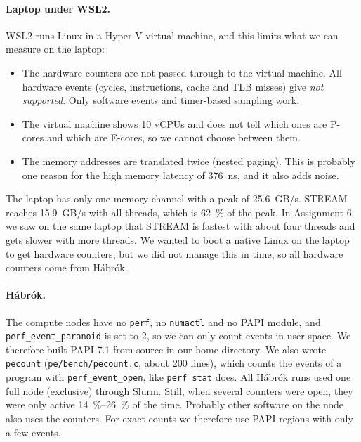 \paragraph{Laptop under WSL2.} WSL2 runs Linux in a Hyper-V virtual machine, and this limits
what we can measure on the laptop:
\begin{itemize}
  \item The hardware counters are not passed through to the virtual machine. All hardware
        events (cycles, instructions, cache and TLB misses) give \emph{not supported}. Only
        software events and timer-based sampling work.
  \item The virtual machine shows 10 vCPUs and does not tell which ones are P-cores and
        which are E-cores, so we cannot choose between them.
  \item The memory addresses are translated twice (nested paging). This is probably one
        reason for the high memory latency of \SI{376}{ns}, and it also adds noise.
\end{itemize}
The laptop has only one memory channel with a peak of \SI{25.6}{GB/s}. STREAM reaches
\SI{15.9}{GB/s} with all threads, which is \SI{62}{\percent} of the peak. In Assignment 6 we
saw on the same laptop that STREAM is fastest with about four threads and gets slower with
more threads. We wanted to boot a native Linux on the laptop to get hardware counters, but we
did not manage this in time, so all hardware counters come from Hábrók.

\paragraph{Hábrók.} The compute nodes have no \texttt{perf}, no \texttt{numactl} and no PAPI
module, and \texttt{perf\_event\_paranoid} is set to 2, so we can only count events in user
space. We therefore built PAPI 7.1 from source in our home directory. We also wrote
\texttt{pecount} (\texttt{pe/bench/pecount.c}, about 200 lines), which counts the events of a
program with \texttt{perf\_event\_open}, like \texttt{perf stat} does. All Hábrók runs used one
full node (exclusive) through Slurm. Still, when several counters were open, they were only
active \SIrange{14}{26}{\percent} of the time. Probably other software on the node also uses
the counters. For exact counts we therefore use PAPI regions with only a few events.
